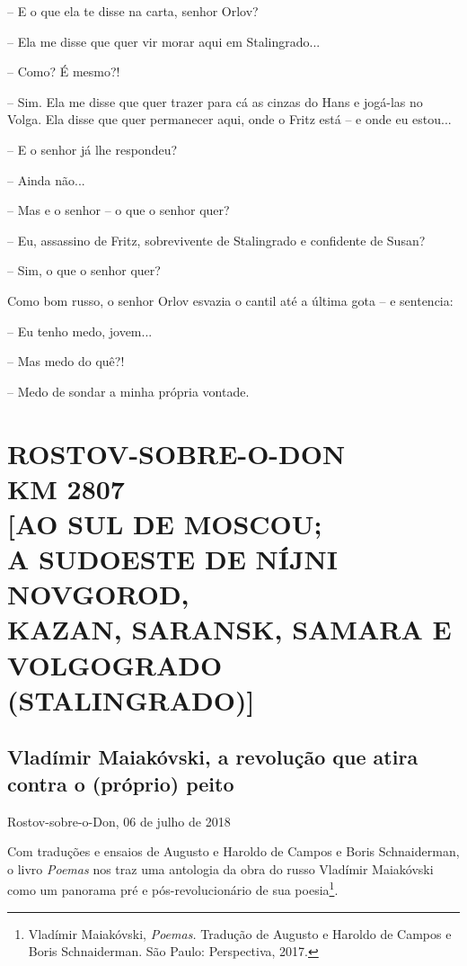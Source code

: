 -- E o que ela te disse na carta, senhor Orlov?

-- Ela me disse que quer vir morar aqui em Stalingrado...

-- Como? É mesmo?!

-- Sim. Ela me disse que quer trazer para cá as cinzas do Hans e
jogá-las no Volga. Ela disse que quer permanecer aqui, onde o Fritz está
-- e onde eu estou...

-- E o senhor já lhe respondeu?

-- Ainda não...

-- Mas e o senhor -- o que o senhor quer?

-- Eu, assassino de Fritz, sobrevivente de Stalingrado e confidente de
Susan?

-- Sim, o que o senhor quer?

Como bom russo, o senhor Orlov esvazia o cantil até a última gota -- e
sentencia:

-- Eu tenho medo, jovem...

-- Mas medo do quê?!

-- Medo de sondar a minha própria vontade.

\newpage
{}
\part*{ROSTOV-SOBRE-O-DON\\KM 2807\\{[}AO SUL DE MOSCOU;\\A SUDOESTE DE NÍJNI NOVGOROD,\\KAZAN, SARANSK, SAMARA E\\VOLGOGRADO (STALINGRADO){]}}

\chapter*{Vladímir Maiakóvski, a revolução que atira contra o (próprio) peito}

\begin{flushright}
Rostov-sobre-o-Don, 06 de julho de 2018
\end{flushright}

Com traduções e ensaios de Augusto e Haroldo de Campos e Boris
Schnaiderman, o livro \emph{Poemas} nos traz uma antologia da obra do
russo Vladímir Maiakóvski como um panorama pré e pós-revolucionário de
sua poesia\footnote{Vladímir Maiakóvski, \emph{Poemas.} Tradução de
  Augusto e Haroldo de Campos e Boris Schnaiderman. São Paulo:
  Perspectiva, 2017.}.

